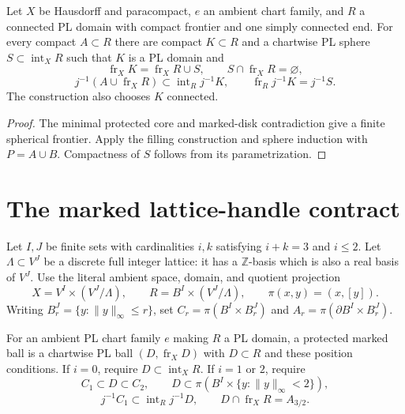 \begin{theorem}
\label{thm:protected-wall-core}
Let $X$ be Hausdorff and paracompact, $e$ an ambient chart family, and $R$
a connected PL domain with compact frontier and one simply connected end.
For every compact $A\subset R$ there are compact $K\subset R$ and a
chartwise PL sphere $S\subset\operatorname{int}_X R$ such that $K$ is a
PL domain and
\[
 \operatorname{fr}_X K=\operatorname{fr}_X R\cup S,\qquad
 S\cap\operatorname{fr}_X R=\varnothing,
\]
\[
 j^{-1}(A\cup\operatorname{fr}_X R)\subset\operatorname{int}_R j^{-1}K,
 \qquad\operatorname{fr}_R j^{-1}K=j^{-1}S.
\]
The construction also chooses $K$ connected.
\end{theorem}
\begin{proof}
The minimal protected core and marked-disk contradiction give a finite
spherical frontier. Apply the filling construction and sphere induction
with $P=A\cup B$. Compactness of $S$ follows from its parametrization.
\end{proof}

\section{The marked lattice-handle contract}
\label{sec:marked-handles}

Let $I,J$ be finite sets with cardinalities $i,k$ satisfying $i+k=3$ and
$i\leq2$. Let $\Lambda\subset V^J$ be a discrete full integer lattice:
it has a $\mathbb Z$-basis which is also a real basis of $V^J$. Use the
literal ambient space, domain, and quotient projection
\[
 X=V^I\times(V^J/\Lambda),\qquad
 R=B^I\times(V^J/\Lambda),\qquad \pi(x,y)=(x,[y]).
\]
Writing $B_r^J=\{y:\|y\|_\infty\leq r\}$, set
$C_r=\pi(B^I\times B_r^J)$ and
$A_r=\pi(\partial B^I\times B_r^J)$.

\begin{definition}
\label{def:protected-marked-ball}
For an ambient PL chart family $e$ making $R$ a PL domain, a protected
marked ball is a chartwise PL ball $(D,\operatorname{fr}_X D)$ with
$D\subset R$ and these position conditions. If $i=0$, require
$D\subset\operatorname{int}_X R$. If $i=1$ or $2$, require
\[
 C_1\subset D\subset C_2,\qquad
 D\subset\pi(B^I\times\{y:\|y\|_\infty<2\}),
\]
\[
 j^{-1}C_1\subset\operatorname{int}_R j^{-1}D,\qquad
 D\cap\operatorname{fr}_X R=A_{3/2}.
\]
\end{definition}

